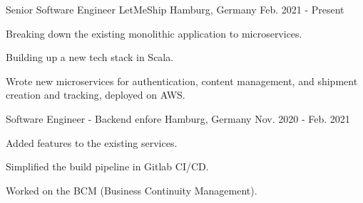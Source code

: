 

\begin{cventries}

  \cventry
    {Senior Software Engineer} %
    {LetMeShip} %
    {Hamburg, Germany} %
    {Feb. 2021 - Present} %
    {
      \begin{cvitems} %
        \item {Breaking down the existing monolithic application to microservices.}
        \item {Building up a new tech stack in Scala.}
        \item {Wrote new microservices for authentication, content management, and shipment creation and tracking, deployed on AWS.}
      \end{cvitems}
    }

  \cventry
    {Software Engineer - Backend} %
    {enfore} %
    {Hamburg, Germany} %
    {Nov. 2020 - Feb. 2021} %
    {
      \begin{cvitems} %
        \item {Added features to the existing services.}
        \item {Simplified the build pipeline in Gitlab CI/CD.}
        \item {Worked on the BCM (Business Continuity Management).}
      \end{cvitems}
    }


\end{cventries}
